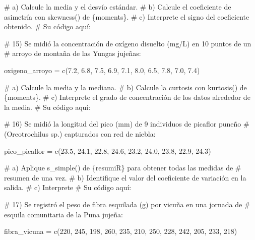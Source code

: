 \documentclass[
  spanish,
  letterpaper,
  DIV=11,
  numbers=noendperiod]{scrreprt}
\newenvironment{Shaded}{\begin{snugshade}}{\end{snugshade}}
\newcommand{\CommentTok}[1]{\textcolor[rgb]{0.37,0.37,0.37}{#1}}
\newcommand{\DecValTok}[1]{\textcolor[rgb]{0.68,0.00,0.00}{#1}}
\newcommand{\FloatTok}[1]{\textcolor[rgb]{0.68,0.00,0.00}{#1}}
\newcommand{\FunctionTok}[1]{\textcolor[rgb]{0.28,0.35,0.67}{#1}}
\newcommand{\NormalTok}[1]{\textcolor[rgb]{0.00,0.23,0.31}{#1}}
\newcommand{\OtherTok}[1]{\textcolor[rgb]{0.00,0.23,0.31}{#1}}
\begin{document}
\begin{Shaded}
\begin{Highlighting}[]
\CommentTok{\#     a) Calcule la media y el desvío estándar.}
\CommentTok{\#     b) Calcule el coeficiente de asimetría con skewness() de \{moments\}.}
\CommentTok{\#     c) Interprete el signo del coeficiente obtenido.}
\CommentTok{\# Su código aquí:}


\CommentTok{\# 15) Se midió la concentración de oxígeno disuelto (mg/L) en 10 puntos de un}
\CommentTok{\#     arroyo de montaña de las Yungas jujeñas:}

\NormalTok{oxigeno\_arroyo }\OtherTok{=} \FunctionTok{c}\NormalTok{(}\FloatTok{7.2}\NormalTok{, }\FloatTok{6.8}\NormalTok{, }\FloatTok{7.5}\NormalTok{, }\FloatTok{6.9}\NormalTok{, }\FloatTok{7.1}\NormalTok{, }\FloatTok{8.0}\NormalTok{, }\FloatTok{6.5}\NormalTok{, }\FloatTok{7.8}\NormalTok{, }\FloatTok{7.0}\NormalTok{, }\FloatTok{7.4}\NormalTok{)}

\CommentTok{\#     a) Calcule la media y la mediana.}
\CommentTok{\#     b) Calcule la curtosis con kurtosis() de \{moments\}.}
\CommentTok{\#     c) Interprete el grado de concentración de los datos alrededor de la media.}
\CommentTok{\# Su código aquí:}


\CommentTok{\# 16) Se midió la longitud del pico (mm) de 9 individuos de picaflor puneño}
\CommentTok{\#     (Oreotrochilus sp.) capturados con red de niebla:}

\NormalTok{pico\_picaflor }\OtherTok{=} \FunctionTok{c}\NormalTok{(}\FloatTok{23.5}\NormalTok{, }\FloatTok{24.1}\NormalTok{, }\FloatTok{22.8}\NormalTok{, }\FloatTok{24.6}\NormalTok{, }\FloatTok{23.2}\NormalTok{, }\FloatTok{24.0}\NormalTok{, }\FloatTok{23.8}\NormalTok{, }\FloatTok{22.9}\NormalTok{, }\FloatTok{24.3}\NormalTok{)}

\CommentTok{\#     a) Aplique s\_simple() de \{resumiR\} para obtener todas las medidas de}
\CommentTok{\#        resumen de una vez.}
\CommentTok{\#     b) Identifique el valor del coeficiente de variación en la salida.}
\CommentTok{\#     c) Interprete}
\CommentTok{\# Su código aquí:}


\CommentTok{\# 17) Se registró el peso de fibra esquilada (g) por vicuña en una jornada de}
\CommentTok{\#     esquila comunitaria de la Puna jujeña:}

\NormalTok{fibra\_vicuna }\OtherTok{=} \FunctionTok{c}\NormalTok{(}\DecValTok{220}\NormalTok{, }\DecValTok{245}\NormalTok{, }\DecValTok{198}\NormalTok{, }\DecValTok{260}\NormalTok{, }\DecValTok{235}\NormalTok{, }\DecValTok{210}\NormalTok{, }\DecValTok{250}\NormalTok{, }\DecValTok{228}\NormalTok{, }\DecValTok{242}\NormalTok{, }\DecValTok{205}\NormalTok{, }\DecValTok{233}\NormalTok{, }\DecValTok{218}\NormalTok{)}


\end{Highlighting}
\end{Shaded}
\end{document}
